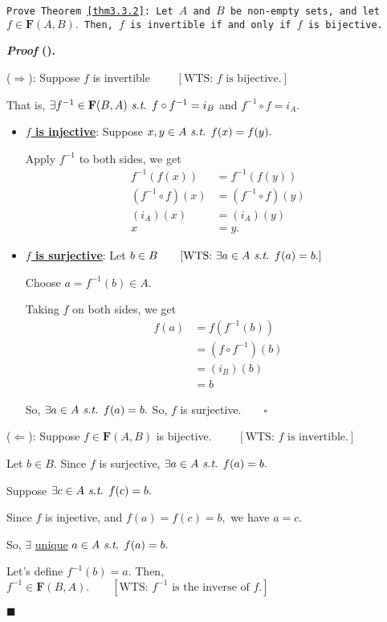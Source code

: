 \documentclass[12pt,a4paper]{article}
\newcounter{nprf}[subsection]
\newenvironment*{prf}{\par\indent\textbf{\textit{Proof} (\stepcounter{nprf}\thenprf). }\par }{\par\hfill $\blacksquare$\par}
\def\f{f^{-1}}
\def\of{\circ}
\def\F{\mathbf{F}}
\def\st{\emph{ s.t. }}
\begin{document}
\begin{framed}
\noindent\texttt{Prove Theorem \ref{thm3.3.2}: Let $A$ and $B$ be non-empty sets, and let $f\in\F(A,B).$ Then, $f$ is invertible if and only if $f$ is bijective.}
\begin{prf}
	($\Rightarrow$): Suppose $f$ is invertible $\qquad[\text{WTS: }f\text{ is bijective.}]$\par\hspace{5mm} That is, $\exists\f\in\F(B,A)\st f\of\f=i_B$ and $\f\of f=i_A.$\par\begin{itemize}
		\item \underline{\textbf{$f$ is injective}}: Suppose $x,y\in A\st f(x)=f(y).$\par Apply $\f$ to both sides, we get \[\begin{aligned}\f(f(x))&=\f(f(y))\\(\f\of f)(x)&=(\f\of f)(y)\\(i_A)(x)&=(i_A)(y)\\x&=y.\end{aligned}\]
		\item \underline{\textbf{$f$ is surjective}}: Let $b\in B\qquad[\text{WTS: }\exists a\in A\st f(a)=b.]$\par Choose $a=\f(b)\in A.$\par Taking $f$ on both sides, we get \[\begin{aligned}f(a)&=f(\f(b))\\&=(f\of\f)(b)\\&=(i_B)(b)\\&=b\end{aligned}\]\par So, $\exists a\in A\st f(a)=b.$ So, $f$ is surjective.$\qquad\square$
	\end{itemize}\par 
	($\Leftarrow$): Suppose $f\in\F(A,B)$ is bijective. $\qquad[\text{WTS: }f\text{ is invertible}.]$\par\hspace{5mm} Let $b\in B.$ Since $f$ is surjective, $\exists a\in A\st f(a)=b.$\par\hspace{5mm} Suppose $\exists c\in A\st f(c)=b.$\par\hspace{5mm} Since $f$ is injective, and $f(a)=f(c)=b,$ we have $a=c.$\par\hspace{5mm} So, $\exists$ \underline{unique} $a\in A\st f(a)=b.$\par\hspace{5mm} Let's define $\f(b)=a.$ Then, $\f\in\F(B,A).\qquad[\text{WTS: }\f\text{ is the inverse of }f.]$\par\begin{itemize}

\end{itemize}
\end{prf}
\end{framed}
\end{document}

